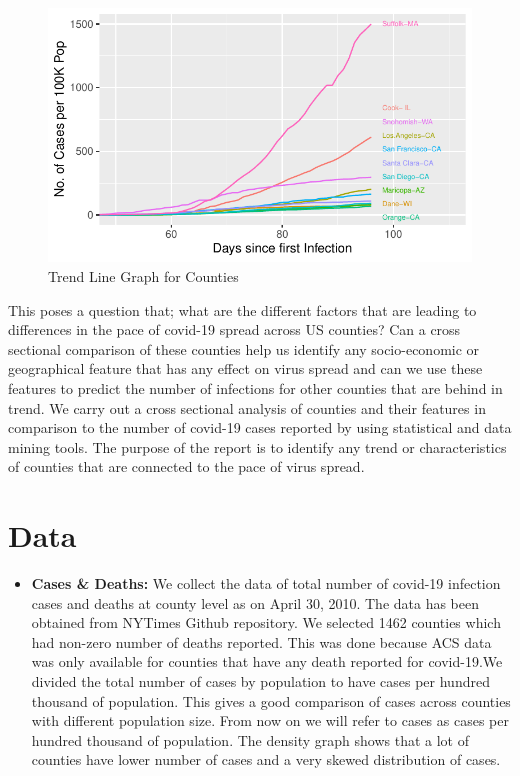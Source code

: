 \documentclass[
]{article}
\providecommand{\tightlist}{%
  \setlength{\itemsep}{0pt}\setlength{\parskip}{0pt}}
\begin{document}
\begin{figure}
\centering
\includegraphics{covid_tree_analysis_files/figure-latex/unnamed-chunk-2-1.pdf}
\caption{Trend Line Graph for Counties}
\end{figure}

This poses a question that; what are the different factors that are
leading to differences in the pace of covid-19 spread across US
counties? Can a cross sectional comparison of these counties help us
identify any socio-economic or geographical feature that has any effect
on virus spread and can we use these features to predict the number of
infections for other counties that are behind in trend. We carry out a
cross sectional analysis of counties and their features in comparison to
the number of covid-19 cases reported by using statistical and data
mining tools. The purpose of the report is to identify any trend or
characteristics of counties that are connected to the pace of virus
spread.

\hypertarget{data}{%
\section{Data}\label{data}}

\begin{itemize}
\tightlist
\item
  \textbf{Cases \& Deaths:} We collect the data of total number of
  covid-19 infection cases and deaths at county level as on April 30,
  2010. The data has been obtained from NYTimes Github repository. We
  selected 1462 counties which had non-zero number of deaths reported.
  This was done because ACS data was only available for counties that
  have any death reported for covid-19.We divided the total number of
  cases by population to have cases per hundred thousand of population.
  This gives a good comparison of cases across counties with different
  population size. From now on we will refer to cases as cases per
  hundred thousand of population. The density graph shows that a lot of
  counties have lower number of cases and a very skewed distribution of
  cases.
\end{itemize}
\end{document}
